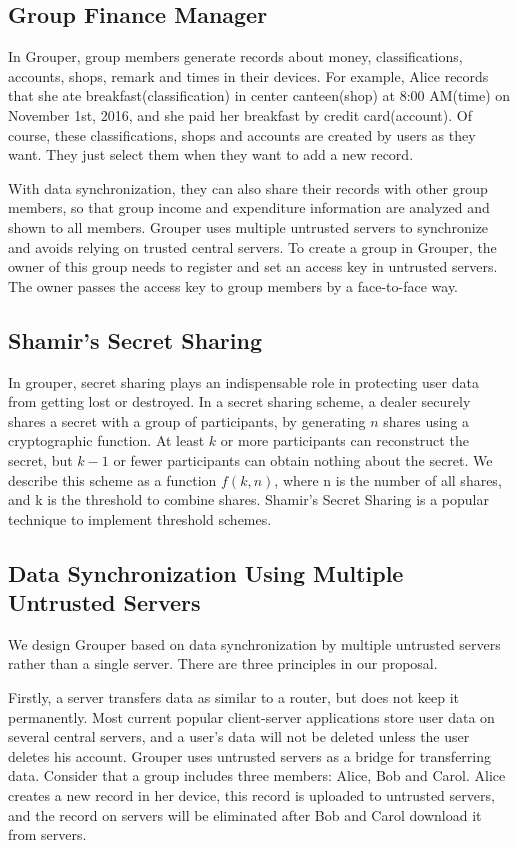 \documentclass[twocolumn,10pt]{article}
\begin{document}
\subsection{Group Finance Manager}
 In Grouper, group members generate records about money, classifications, accounts, shops, remark and times in their devices. For example, Alice records that she ate breakfast(classification) in center canteen(shop) at 8:00 AM(time) on November 1st, 2016, and she paid her breakfast by credit card(account). Of course, these classifications, shops and accounts are created by users as they want. They just select them when they want to add a new record.

 With data synchronization, they can also share their records with other group members, so that group income and expenditure information are analyzed and shown to all members. Grouper uses multiple untrusted servers to synchronize and avoids relying on trusted central servers. To create a group in Grouper, the owner of this group needs to register and set an access key in untrusted servers. The owner passes the access key to group members by a face-to-face way.

\subsection{Shamir's Secret Sharing}
In grouper, secret sharing plays an indispensable role in protecting user data from getting lost or destroyed. In a secret sharing scheme, a dealer securely shares a secret with a group of participants, by generating $n$ shares using a cryptographic function\cite{smith2013layered}. At least $k$ or more participants can reconstruct the secret, but $k-1$ or fewer participants can obtain nothing about the secret\cite{pang2005new}. We describe this scheme as a function $f(k, n)$, where n is the number of all shares, and k is the threshold to combine shares.  Shamir's Secret Sharing is a popular technique to implement threshold schemes.

\subsection{Data Synchronization Using Multiple Untrusted Servers}

We design Grouper based on data synchronization by multiple untrusted servers rather than a single server. There are three principles in our proposal. 

Firstly, a server transfers data as similar to a router, but does not keep it permanently. Most current popular client-server applications store user data on several central servers, and a user's data will not be deleted unless the user deletes his account. Grouper uses untrusted servers as a bridge for transferring data. Consider that a group includes three members: Alice, Bob and Carol. Alice creates a new record in her device, this record is uploaded to untrusted servers, and the record on servers will be eliminated after Bob and Carol download it from servers.
\end{document}
